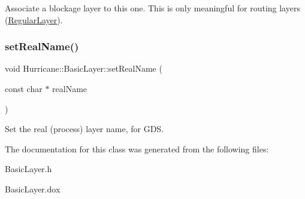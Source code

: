 Associate a blockage layer to this one. This is only meaningful for routing layers (\mbox{\hyperlink{classHurricane_1_1RegularLayer}{Regular\+Layer}}). \mbox{\label{classHurricane_1_1BasicLayer_aa5aa1e1079c14d7e9c05799d14e726af}} 
\subsubsection{\texorpdfstring{set\+Real\+Name()}{setRealName()}}
{\footnotesize\ttfamily void Hurricane\+::\+Basic\+Layer\+::set\+Real\+Name (\begin{DoxyParamCaption}\item[{const char $\ast$}]{real\+Name }\end{DoxyParamCaption})\hspace{0.3cm}{\ttfamily [inline]}}

Set the real (process) layer name, for G\+DS. 

The documentation for this class was generated from the following files\+:\begin{DoxyCompactItemize}
\item 
Basic\+Layer.\+h\item 
Basic\+Layer.\+dox\end{DoxyCompactItemize}
